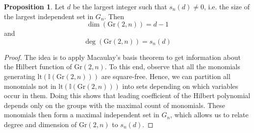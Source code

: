 \documentclass{scrartcl}
\newcommand{\I}{\mathbb{I}}
\newcommand{\Gr}{\mathrm{Gr}}
\theoremstyle{definition}
\newtheorem{proposition}[subsection]{Proposition}
\begin{document}
\begin{proposition}
    Let $d$ be the largest integer such that $s_n(d) \neq 0$, i.e. the size of the largest independent set in $G_n$.
    Then
    \begin{equation*}
        \dim(\Gr(2, n)) = d - 1
    \end{equation*}
    and
    \begin{equation*}
        \deg(\Gr(2, n)) = s_n(d)
    \end{equation*}
\end{proposition}
\begin{proof}
    The idea is to apply Macaulay's basis theorem to get information about the Hilbert function of $\Gr(2, n)$.
    To this end, observe that all the monomials generating $\mathrm{lt}(\I(\Gr(2, n)))$ are square-free.
    Hence, we can partition all monomials not in $\mathrm{lt}(\I(\Gr(2, n)))$ into sets depending on which variables occur in them.
    Doing this shows that leading coefficient of the Hilbert polynomial depends only on the groups with the maximal count of monomials.
    These monomials then form a maximal independent set in $G_n$, which allows us to relate degree and dimension of $\Gr(2, n)$ to $s_n(d)$. 


\end{proof}
\end{document}
